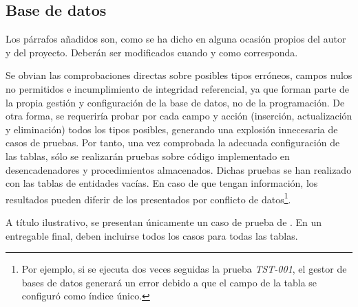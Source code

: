 \subsection{\forlnameref Base de datos}
\label{sec:databaseTests}

\begin{shaded}
Los párrafos añadidos son, como se ha dicho en alguna ocasión propios del autor y del proyecto. Deberán ser modificados cuando y como corresponda.
\end{shaded}

Se obvian las comprobaciones directas sobre posibles tipos erróneos, campos nulos no permitidos e incumplimiento de integridad referencial, ya que forman parte de la propia gestión y configuración de la base de datos, no de la programación. De otra forma, se requeriría probar por cada campo y acción (inserción, actualización y eliminación) todos los tipos posibles, generando una explosión innecesaria de casos de pruebas. Por tanto, una vez comprobada la adecuada configuración de las tablas, sólo se realizarán pruebas sobre código implementado en desencadenadores y procedimientos almacenados. Dichas pruebas se han realizado con las tablas de entidades vacías. En caso de que tengan información, los resultados pueden diferir de los presentados por conflicto de datos\footnote{Por ejemplo, si se ejecuta dos veces seguidas la prueba \textit{TST-001}, el gestor de bases de datos generará un error debido a que el campo  de la tabla  se configuró como índice único.}.


\def \tstRules          {-}
\def \tstTable          {User}
\def \tstAction         {C} %
\def \tstValidate       {\checkmark}
\def \tstDescription    {Una inserción con valores válidos se realiza adecuadamente.}
\def \tstCode           {
    \code{SELECT COUNT(*) FROM User;} \\
    \code{INSERT INTO User (IsSupervisor, Name, Surname, Login, Password)} \\
    \code{VALUES (TRUE, \textquotesingle Bruce\textquotesingle, \textquotesingle Wayne\textquotesingle, 
    \textquotesingle batm\textquotesingle, \textquotesingle 12345\textquotesingle);} \\
    \code{SELECT COUNT(*) FROM User;} \\
    \code{SELECT * FROM User ORDER BY Id DESC LIMIT 1;}
}
\def \tstResult         {
    \code{0} \\
    \code{1} \\
    \code{1, TRUE, \textquotesingle Bruce\textquotesingle, 
    \textquotesingle Wayne\textquotesingle, \textquotesingle batm\textquotesingle, \textquotesingle 12345\textquotesingle}
}
\def \tstCaption    {Inserción válida en tabla \code{User}}

\begin{shaded}
A título ilustrativo, se presentan únicamente un caso de prueba de . En un entregable final, deben incluirse todos los casos para todas las tablas.
\end{shaded}
